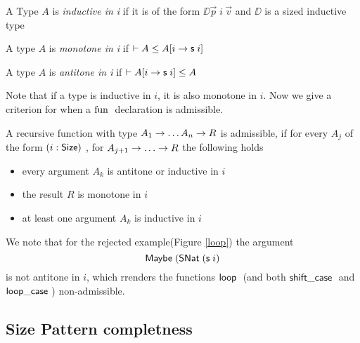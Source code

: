 \begin{definition}
A Type $A$ is \emph{inductive in i} if it is of the form $ \DD \vec{p} \; i \: \vec{v} $ and $\DD$ is a sized inductive type
\end{definition}
\begin{definition}
A type $A$ is \emph{monotone in i} if $ \vdash A\leq A[i \rightarrow \mathsf{s}\; i ]$ 
\end{definition}
\begin{definition}
A type $A$ is \emph{antitone in i} if $ \vdash A[i \rightarrow \mathsf{s}\; i ]\leq A$ 
\end{definition}
Note that if a type is inductive in $i$, it is also monotone in $i$. 
Now we give a criterion for when a $\mathrm{fun}\;$ declaration is admissible.
\begin{definition}
A recursive function with type $ A_1 \rightarrow \dots A_n \rightarrow R $ is admissible, if
for every $A_j$ of the form $(i : \mathsf{Size} )$ , for $A_{j + 1} \ra \dots \ra R $ the following holds 
\begin{itemize}
\item
every argument $A_k$ is antitone or inductive in $i$
\item
the result $R$ is monotone in $i$  
\item
at least one argument $A_k$ is inductive in $i$
\end{itemize}
\end{definition}
We note that for the rejected example(Figure \ref{loop}) the argument \[\mathsf{Maybe}\; (\mathsf{SNat}\; (\mathsf{s}\; i)\] is not antitone in $i$, which rrenders the functions $\mathsf{loop}\;$ (and both $ \mathsf{shift\_case}\;$ and $\mathsf{loop\_case}\;$) non-admissible.

\subsection{Size Pattern completness}


